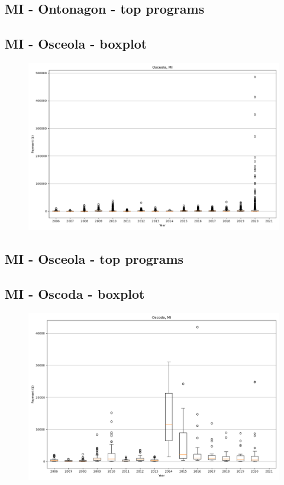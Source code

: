 \subsection*{MI - Ontonagon - top programs}

\newpage
\subsection*{MI - Osceola - boxplot}
\begin{figure}[h]
\centering
\includegraphics[width=7in]{../output/boxplots/counties/Osceola-MI_boxplot.png}
\end{figure}


\subsection*{MI - Osceola - top programs}

\newpage
\subsection*{MI - Oscoda - boxplot}
\begin{figure}[h]
\centering
\includegraphics[width=7in]{../output/boxplots/counties/Oscoda-MI_boxplot.png}
\end{figure}



